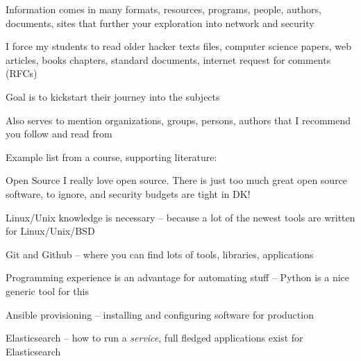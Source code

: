 \documentclass[Screen16to9,17pt]{foils}
\begin{document}
\begin{list2}
\item Information comes in many formats, resources, programs, people, authors, documents, sites
that further your exploration into network and security

\item I force my students to read older hacker texts files, computer science papers, web articles, books chapters, standard documents, internet request for comments (RFCs)

\item Goal is to kickstart their journey into the subjects

\item Also serves to mention organizations, groups, persons, authors that I recommend you follow and read from
\end{list2}

Example list from a course, supporting literature:\\








\begin{quote}

\end{quote}

\begin{list2}
\item Open Source I really love open source. There is just too much great open source software, to ignore, and security budgets are tight in DK!
\item Linux/Unix knowledge is necessary
-- because a lot of the newest tools are written for Linux/Unix/BSD
\item Git and Github -- where you can find lots of tools, libraries, applications
\item Programming experience is an advantage for automating stuff -- Python is a nice generic tool for this
\item Ansible provisioning -- installing and configuring software for production
\item Elasticsearch -- how to run a \emph{service}, full fledged applications exist for Elasticsearch
\end{list2}
\end{document}
